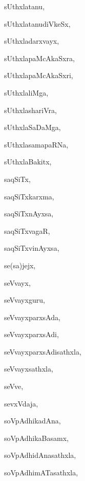 \begin{multicols}{3}
{\noindent
{sUthxlatanu}, \pageref{sUthxlatanu}

\noindent
{sUthxlatanudiVkeSx}, \pageref{sUthxlatanudiVkeSx}

\noindent
{sUthxladarxvayx}, \pageref{sUthxladarxvayx}

\noindent
{sUthxlapaMcAkaSxra}, \pageref{sUthxlapaMcAkaSxra}

\noindent
{sUthxlapaMcAkaSxri}, \pageref{sUthxlapaMcAkaSxri}

\noindent
{sUthxlaliMga}, \pageref{sUthxlaliMga}

\noindent
{sUthxlashariVra}, \pageref{sUthxlashariVra}

\noindent
{sUthxlaSaDaMga}, \pageref{sUthxlaSaDaMga}

\noindent
{sUthxlasamapaRNa}, \pageref{sUthxlasamapaRNa}

\noindent
{sUthxlaBakitx}, \pageref{sUthxlaBakitx}

\noindent
{saqSiTx}, \pageref{saqSiTx}

\noindent
{saqSiTxkarxma}, \pageref{saqSiTxkarxma}

\noindent
{saqSiTxnAyxsa}, \pageref{saqSiTxnAyxsa}

\noindent
{saqSiTxvagaR}, \pageref{saqSiTxvagaR}

\noindent
{saqSiTxvinAyxsa}, \pageref{saqSiTxvinAyxsa}

\noindent
{se(sa)jejx}, \pageref{sesajejx}

\noindent
{seVvayx}, \pageref{seVvayx}

\noindent
{seVvayxguru}, \pageref{seVvayxguru}

\noindent
{seVvayxparxsAda}, \pageref{seVvayxparxsAda}

\noindent
{seVvayxparxsAdi}, \pageref{seVvayxparxsAdi}

\noindent
{seVvayxparxsAdisathxla}, \pageref{seVvayxparxsAdisathxla}

\noindent
{seVvayxsathxla}, \pageref{seVvayxsathxla}

\noindent
{seVve}, \pageref{seVve}

\noindent
{sevxVdaja}, \pageref{sevxVdaja}

\noindent
{soVpAdhikadAna}, \pageref{soVpAdhikadAna}

\noindent
{soVpAdhikaBasamx}, \pageref{soVpAdhikaBasamx}

\noindent
{soVpAdhidAnasathxla}, \pageref{soVpAdhidAnasathxla}

\noindent
{soVpAdhimATasathxla}, \pageref{soVpAdhimATasathxla}

}
\end{multicols}
